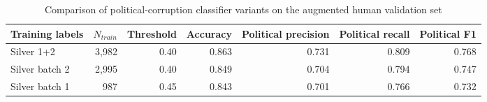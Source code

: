 \begin{table}[htbp]
\centering
\small
\caption{Comparison of political-corruption classifier variants on the augmented human validation set}
\label{tab:pc-classifier-comparison}
\begin{tabular}{lrrrrrr}
\toprule
Training labels & $N_{train}$ & Threshold & Accuracy & Political precision & Political recall & Political F1 \\
\midrule
Silver 1+2 & 3,982 & 0.40 & 0.863 & 0.731 & 0.809 & 0.768 \\
Silver batch 2 & 2,995 & 0.40 & 0.849 & 0.704 & 0.794 & 0.747 \\
Silver batch 1 & 987 & 0.45 & 0.843 & 0.701 & 0.766 & 0.732 \\
\bottomrule
\end{tabular}
\end{table}
